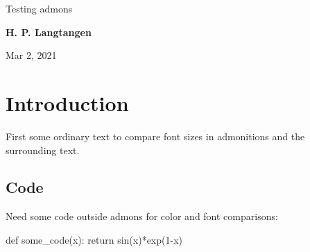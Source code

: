 \documentclass[%
oneside,                 %
final,                   %
10pt]{article}
\begin{document}

\newcommand{\exercisesection}[1]{\subsection*{#1}}








\thispagestyle{empty}

\begin{center}
{\LARGE\bf
\begin{spacing}{1.25}
Testing admons
\end{spacing}
}
\end{center}


\begin{center}
{\bf H. P. Langtangen${}^{}$} \\ [0mm]
\end{center}

\begin{center}
\end{center}
    

\begin{center}
Mar 2, 2021
\end{center}

\vspace{1cm}


\section{Introduction}
First some ordinary text to compare font sizes in admonitions
and the surrounding text.

\subsection{Code}

Need some code outside admons for color and font comparisons:

\bpycod
def some_code(x):
    return sin(x)*exp(1-x)
\epycod
\end{document}
